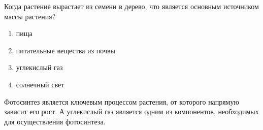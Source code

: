 
Когда растение вырастает из семени в дерево, что является основным источником массы растения?

\begin{enumerate}
    \item пища
    \item питательные вещества из почвы 
    \item углекислый газ 
    \item солнечный свет
\end{enumerate}

\explanationSection

Фотосинтез является ключевым процессом растения, от которого напрямую зависит его рост. А углекислый газ является одним из компонентов, необходимых для осуществления фотосинтеза.

